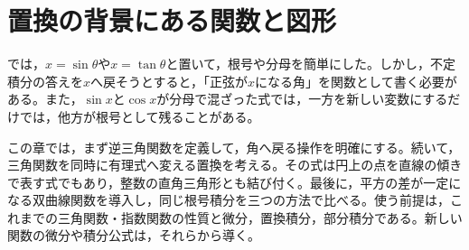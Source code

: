 \chapter{置換の背景にある関数と図形}\label{章:置換の背景}

では，$x=\sin\theta$や$x=\tan\theta$と置いて，根号や分母を簡単にした。しかし，不定積分の答えを$x$へ戻そうとすると，「正弦が$x$になる角」を関数として書く必要がある。また，$\sin x$と$\cos x$が分母で混ざった式では，一方を新しい変数にするだけでは，他方が根号として残ることがある。

この章では，まず逆三角関数を定義して，角へ戻る操作を明確にする。続いて，三角関数を同時に有理式へ変える置換を考える。その式は円上の点を直線の傾きで表す式でもあり，整数の直角三角形とも結び付く。最後に，平方の差が一定になる双曲線関数を導入し，同じ根号積分を三つの方法で比べる。使う前提は，これまでの三角関数・指数関数の性質と微分，置換積分，部分積分である。新しい関数の微分や積分公式は，それらから導く。

%
%
%
%
%
%
%
